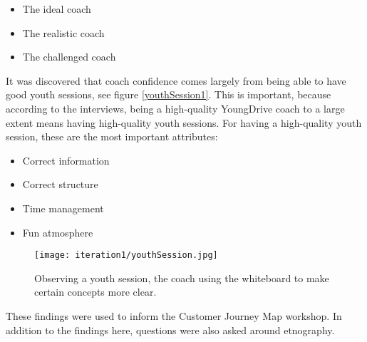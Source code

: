 \begin{itemize}
  \item The ideal coach
  \item The realistic coach
  \item The challenged coach
\end{itemize}

It was discovered that coach confidence comes largely from being able to have good youth sessions, see figure \ref{youthSession1}. This is important, because according to the interviews, being a high-quality YoungDrive coach to a large extent means having high-quality youth sessions. For having a high-quality youth session, these are the most important attributes:

\begin{itemize}
  \item Correct information
  \item Correct structure
  \item Time management
  \item Fun atmosphere
\end{itemize}

\begin{figure}[h]
  \centering
  \texttt{[image: iteration1/youthSession.jpg]}
  \caption{Observing a youth session, the coach using the whiteboard to make certain concepts more clear.}
  \label{fig:youthSession1}
\end{figure}

These findings were used to inform the Customer Journey Map workshop. In addition to the findings here, questions were also asked around etnography.

